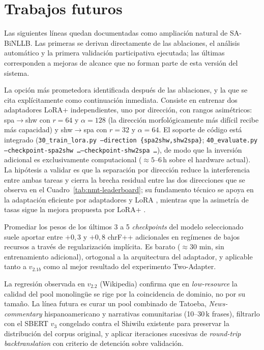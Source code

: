 \documentclass[12pt,a4paper,oneside]{book}
\begin{document}
\section{Trabajos futuros}\label{trabajos-futuros}

Las siguientes líneas quedan documentadas como ampliación natural de SA-BiNLLB. Las primeras se derivan directamente de las ablaciones, el análisis automático y la primera validación participativa ejecutada; las últimas corresponden a mejoras de alcance que no forman parte de esta versión del sistema.

\begin{description}[leftmargin=*]
  \item[Arquitectura \emph{Two-Adapter} LoRA+ con rangos asimétricos.] La opción más prometedora identificada después de las ablaciones, y la que se cita explícitamente como continuación inmediata. Consiste en entrenar dos adaptadores LoRA+ independientes, uno por dirección, con rangos asimétricos: spa\(\rightarrow\)shw con \(r=64\) y \(\alpha=128\) (la dirección morfológicamente más difícil recibe más capacidad) y shw\(\rightarrow\)spa con \(r=32\) y \(\alpha=64\). El soporte de código está integrado (\texttt{30\_train\_lora.py --direction \{spa2shw,shw2spa\}}; \texttt{40\_evaluate.py --checkpoint-spa2shw \ldots --checkpoint-shw2spa \ldots}), de modo que la inversión adicional es exclusivamente computacional (\(\approx 5\)--\(6\)\,h sobre el hardware actual). La hipótesis a validar es que la separación por dirección reduce la interferencia entre ambas tareas y cierra la brecha residual entre las dos direcciones que se observa en el Cuadro~\ref{tab:nmt-leaderboard}; su fundamento técnico se apoya en la adaptación eficiente por adaptadores y LoRA \parencite{houlsby2019,hu2022lora}, mientras que la asimetría de tasas sigue la mejora propuesta por LoRA+ \parencite{hayou2024loraplus}.
  \item[\emph{Stochastic Weight Averaging} sobre el modelo seleccionado.] Promediar los pesos de los últimos 3 a 5 \emph{checkpoints} del modelo seleccionado \parencite{izmailov2018swa} suele aportar entre \(+0{,}3\) y \(+0{,}8\) chrF++ adicionales en regímenes de bajos recursos a través de regularización implícita. Es barato (\(\approx 30\) min, sin entrenamiento adicional), ortogonal a la arquitectura del adaptador, y aplicable tanto a \(v_{2.1b}\) como al mejor resultado del experimento Two-Adapter.
  \item[Iterative backtranslation con corpus monolingüe controlado por dominio.] La regresión observada en \(v_{2.2}\) (Wikipedia) confirma que en \emph{low-resource} la calidad del pool monolingüe se rige por la coincidencia de dominio, no por su tamaño. La línea futura es curar un pool combinado de Tatoeba, \emph{News-commentary} hispanoamericano y narrativas comunitarias (10--30\,k frases), filtrarlo con el SBERT \(v_3\) congelado contra el Shiwilu existente para preservar la distribución del corpus original, y aplicar iteraciones sucesivas de \emph{round-trip backtranslation} \parencite{edunov2018bt,hoang2018iterativebt} con criterio de detención sobre validación.

\end{description}
\end{document}
